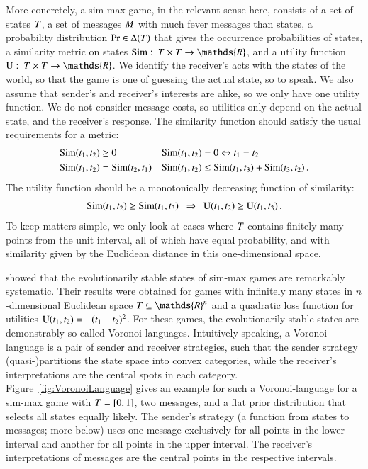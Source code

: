 More concretely, a sim-max game, in the relevant sense here, consists
of a set of states $T$, a set of messages $M$ with much
fever messages than states, a probability distribution $\Pr \in
\Delta(T)$ that gives the occurrence probabilities of states, a
similarity metric on states $\similarity \mycolon \States \times
\States \rightarrow \mathds{R}$, and a utility function $\Utils
\mycolon \States \times \States \rightarrow \mathds{R}$. We identify
the receiver's acts with the states of the world, so that the game is
one of guessing the actual state, so to speak. We also assume that
sender's and receiver's interests are alike, so we only have one
utility function. We do not consider message costs, so utilities only
depend on the actual state, and the receiver's response. The
similarity function should satisfy the usual requirements for a
metric:
\begin{align*}
  & \mathrm{Sim}(t_{\mathrm{1}}, t_{\mathrm{2}}) \ge 0 &&
  \mathrm{Sim}(t_{\mathrm{1}}, t_{\mathrm{2}}) = 0 \Leftrightarrow
  t_{\mathrm{1}} = t_{\mathrm{2}} \\
  & \mathrm{Sim}(t_{\mathrm{1}}, t_{\mathrm{2}}) = \mathrm{Sim}(t_{\mathrm{2}},
  t_{\mathrm{1}}) && \mathrm{Sim}(t_{\mathrm{1}}, t_{\mathrm{2}}) \le
  \mathrm{Sim}(t_{\mathrm{1}}, t_{\mathrm{3}}) + \mathrm{Sim}(t_{\mathrm{3}}, t_{\mathrm{2}})\,.
\end{align*}
The utility function should be a monotonically decreasing function of
similarity:
\begin{align*}
  \similarity(\mystate{1},\mystate{2}) \ge
  \similarity(\mystate{1},\mystate{3}) \ \ \Rightarrow \ \ 
  \Utils(\mystate{1},\mystate{2}) \ge
  \Utils(\mystate{1},\mystate{3})\,.
\end{align*}
To keep matters simple, we only look at cases where $T$ contains
finitely many points from the unit interval, all of which have equal
probability, and with similarity given by the Euclidean distance in
this one-dimensional space.

\citet{JagerMetzger2011:Voronoi-Languag} showed that the
evolutionarily stable states of sim-max games are remarkably
systematic. Their results were obtained for games with infinitely many
states in $n$-dimensional Euclidean space $\States \subseteq
\mathds{R}^n$ and a quadratic loss function for utilities
$\mathrm{U}(t_{\mathrm{1}}, t_{\mathrm{2}}) = - (t_{\mathrm{1}} -
t_{\mathrm{2}})^2$. For these games, the evolutionarily stable states are
demonstrably so-called Voronoi-languages. Intuitively speaking, a
Voronoi language is a pair of sender and receiver strategies, such
that the sender strategy (quasi-)partitions the state space into
convex categories, while the receiver's interpretations are the
central spots in each category. Figure~\ref{fig:VoronoiLanguage} gives
an example for such a Voronoi-language for a sim-max game with
$T = [0,1]$, two messages, and a flat prior distribution that
selects all states equally likely. The sender's strategy (a function
from states to messages; more below) uses one message exclusively for
all points in the lower interval and another for all points in the
upper interval. The receiver's interpretations of messages are the
central points in the respective intervals. 

